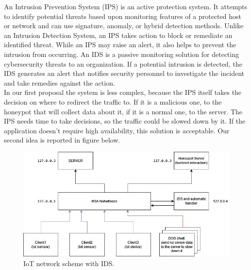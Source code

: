 An Intrusion Prevention System (IPS) is an active protection system. It attempts to identify potential threats based upon monitoring features of a protected host or network and can use signature, anomaly, or hybrid detection methods. Unlike an Intrusion Detection System, an IPS takes action to block or remediate an identified threat. While an IPS may raise an alert, it also helps to prevent the intrusion from occurring. An IDS is a passive monitoring solution for detecting cybersecurity threats to an organization. If a potential intrusion is detected, the IDS generates an alert that notifies security personnel to investigate the incident and take remedies against the action. \\
In our first proposal the system is less complex, because the IPS itself takes the decision on where to redirect the traffic to. If it is a malicious one, to the honeypot that will collect data about it, if it is a normal one, to the server. The IPS needs time to take decisions, so the traffic could be slowed down by it. If the application doesn't require high availability, this solution is acceptable.
Our second idea is reported in figure below.

\begin{figure}[h!]
  \centering
  \includegraphics[width = 15cm]{images/IOTIDS.drawio.png}
  \caption{IoT network scheme with IDS.}
  \label{fig:1period}
\end{figure}
\FloatBarrier

